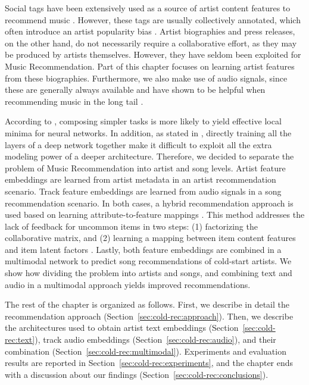 Social tags have been extensively used as a source of artist content features to recommend music \citep{Knees2013}. However, these tags are usually collectively annotated, which often introduce an artist popularity bias \citep{Turnbull2008}.
Artist biographies and press releases, on the other hand, do not necessarily require a collaborative effort, as they may be produced by artists themselves. 
However, they have seldom been exploited for Music Recommendation.
Part of this chapter focuses on learning artist features from these biographies.
Furthermore, we also make use of audio signals, since these are generally always available and have shown to be helpful when recommending music in the long tail \citep{Oord2013}.

According to \cite{gulccehre2016knowledge}, composing simpler tasks is more likely to yield effective local minima for neural networks. In addition, as stated in \cite{larochelle2009exploring}, directly training all the layers of a deep network together make it difficult to exploit all the extra modeling power of a deeper architecture. 
Therefore, we decided to separate the problem of Music Recommendation into artist and song levels.
Artist feature embeddings are learned from artist metadata in an artist recommendation scenario.
Track feature embeddings are learned from audio signals in a song recommendation scenario.
In both cases, a hybrid recommendation approach is used based on learning attribute-to-feature mappings \citep{GantnerDFRS10}.
This method addresses the lack of feedback for uncommon items in two steps: (1) factorizing the collaborative matrix, and (2) learning a mapping between item content features and item latent factors \citep{Oord2013,bansal2016ask}.
Lastly, both feature embeddings are combined in a multimodal network to predict song recommendations of cold-start artists.
We show how dividing the problem into artists and songs, and combining text and audio in a multimodal approach yields improved recommendations.

The rest of the chapter is organized as follows. First, we describe in detail the recommendation approach (Section~\ref{sec:cold-rec:approach}). Then, we describe the architectures used to obtain artist text embeddings (Section~\ref{sec:cold-rec:text}), track audio embeddings (Section~\ref{sec:cold-rec:audio}), and their combination (Section~\ref{sec:cold-rec:multimodal}). Experiments and evaluation results are reported in Section~\ref{sec:cold-rec:experiments}, and the chapter ends with a discussion about our findings (Section~\ref{sec:cold-rec:conclusions}).



